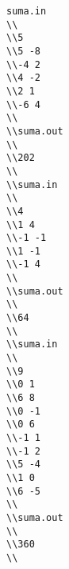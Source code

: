 \begin{verbatim}
suma.in 
\\
\\5 
\\5 -8 
\\-4 2 
\\4 -2 
\\2 1 
\\-6 4 
\\
\\suma.out 
\\
\\202 
\\
\\suma.in 
\\
\\4 
\\1 4 
\\-1 -1 
\\1 -1 
\\-1 4 
\\
\\suma.out 
\\
\\64
\\
\\suma.in 
\\
\\9 
\\0 1 
\\6 8 
\\0 -1 
\\0 6 
\\-1 1 
\\-1 2 
\\5 -4 
\\1 0 
\\6 -5 
\\
\\suma.out 
\\
\\360 
\\\end{verbatim}